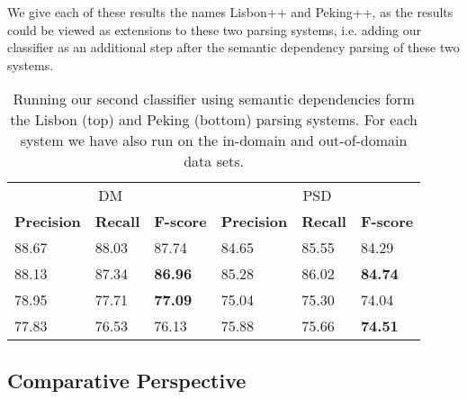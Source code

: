We give each of these results the names Lisbon++ and Peking++, as the results could be viewed as extensions to these two parsing systems, i.e. adding our classifier as an additional step after the semantic dependency parsing of these two systems. 


\begin{table}
    \centering
    \smaller[0.2]
    \begin{tabular}{@{}llllll@{}}
        \toprule
        \multicolumn{3}{c}{DM}
        & \multicolumn{3}{c}{PSD} \\
        \textbf{Precision} & \textbf{Recall} & \textbf{F-score} & \textbf{Precision} & \textbf{Recall} & \textbf{F-score} \\
        \midrule
        88.67 & 88.03 & 87.74 & 84.65 & 85.55 & 84.29 \\
        88.13 & 87.34 & \textbf{86.96} & 85.28 & 86.02 & \textbf{84.74} \\
        \bottomrule
        78.95 & 77.71 & \textbf{77.09} & 75.04 & 75.30 & 74.04 \\
        77.83 & 76.53 & 76.13 & 75.88 & 75.66 & \textbf{74.51} \\
    \end{tabular}
    \caption{Running our second classifier using semantic dependencies form the Lisbon (top) and Peking (bottom) parsing systems. For each system we have also run on the in-domain and out-of-domain data sets.}
    \label{table:final_results_peking_lisbon}
\end{table}


\subsection{Comparative Perspective}
\label{results:comparisons}

